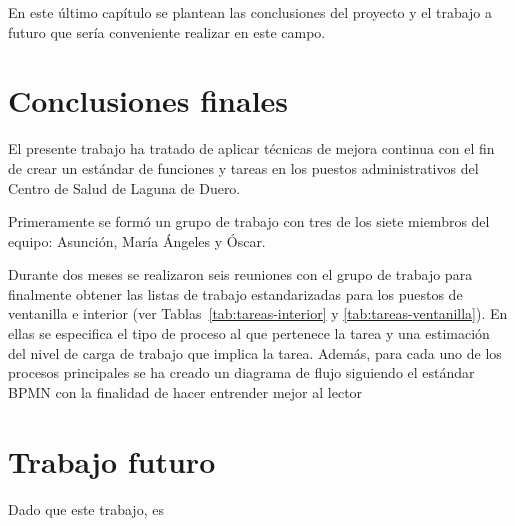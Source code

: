En este último capítulo se plantean las conclusiones del proyecto y el trabajo a futuro que sería conveniente realizar en este campo.

\section{Conclusiones finales}

El presente trabajo ha tratado de aplicar técnicas de mejora continua con el fin de crear un estándar de funciones y tareas en los puestos administrativos del Centro de Salud de Laguna de Duero.

Primeramente se formó un grupo de trabajo con tres de los siete miembros del equipo: Asunción, María Ángeles y Óscar.

Durante dos meses se realizaron seis reuniones con el grupo de trabajo para finalmente obtener las listas de trabajo estandarizadas para los puestos de ventanilla e interior (ver Tablas~\ref{tab:tareas-interior} y \ref{tab:tareas-ventanilla}). En ellas se especifica el tipo de proceso al que pertenece la tarea y una estimación del nivel de carga de trabajo que implica la tarea. Además, para cada uno de los procesos principales se ha creado un diagrama de flujo siguiendo el estándar BPMN con la finalidad de hacer entrender mejor al lector

\section{Trabajo futuro}

Dado que este trabajo, es